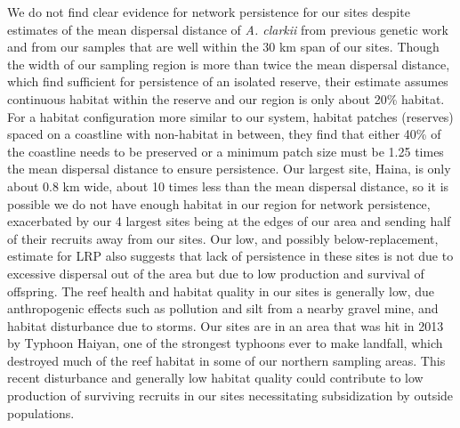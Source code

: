 \documentclass[12pt, oneside]{article}   	%
\begin{document}
We do not find clear evidence for network persistence for our sites despite estimates of the mean dispersal distance of \textit{A. clarkii} from previous genetic work \citep[11 km,][]{pinsky2010using} and from our samples \citep[8.25 km, with 95\% confidence interval 7.41 to 9.36,][]{catalanoInPrepconnectivity} that are well within the 30 km span of our sites. Though the width of our sampling region is more than twice the mean dispersal distance, which \cite{lockwood2002effects} find sufficient for persistence of an isolated reserve, their estimate assumes continuous habitat within the reserve and our region is only about 20\% habitat. For a habitat configuration more similar to our system, habitat patches (reserves) spaced on a coastline with non-habitat in between, they find that either 40\% of the coastline needs to be preserved or a minimum patch size must be 1.25 times the mean dispersal distance to ensure persistence. Our largest site, Haina, is only about 0.8 km wide, about 10 times less than the mean dispersal distance, so it is possible we do not have enough habitat in our region for network persistence, exacerbated by our 4 largest sites being at the edges of our area and sending half of their recruits away from our sites. Our low, and possibly below-replacement, estimate for LRP also suggests that lack of persistence in these sites is not due to excessive dispersal out of the area but due to low production and survival of offspring. The reef health and habitat quality in our sites is generally low, due anthropogenic effects such as pollution and silt from a nearby gravel mine, and habitat disturbance due to storms. Our sites are in an area that was hit in 2013 by Typhoon Haiyan, one of the strongest typhoons ever to make landfall, which destroyed much of the reef habitat in some of our northern sampling areas. This recent disturbance and generally low habitat quality could contribute to low production of surviving recruits in our sites \citep[seen in other populations with low habitat quality, e.g.][]{hayashi2019low} necessitating subsidization by outside populations.
\end{document}
